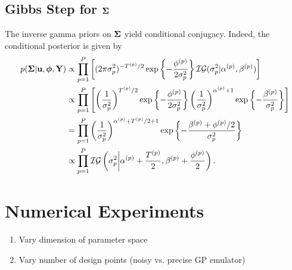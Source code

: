 \documentclass[12pt]{article}
\newcommand{\bphi}{\boldsymbol{\phi}}
\begin{document}
\subsection{Gibbs Step for $\boldsymbol{\Sigma}$}
The inverse gamma priors on $\boldsymbol{\Sigma}$ yield conditional conjugacy. Indeed, the conditional posterior is given by 
\begin{align*}
p(\CovObs | \bpar, \bphi, \stateMat) 
&\propto \prod_{\objIdx=1}^{\Nobj} \left[(2\pi\sdObs^2_{\objIdx})^{-\indexObj{\Ntime}/2} \exp\left\{-\frac{\indexObj{\phi} }{2\sdObs^2_{\objIdx}} \right\} 
\mathcal{IG}(\sdObs^2_{\objIdx}| \indexObj{\IGShape}, \indexObj{\IGScale}) \right] \\
&\propto \prod_{\objIdx=1}^{\Nobj} \left[\left(\frac{1}{\sdObs^2_{\objIdx}}\right)^{\indexObj{\Ntime}/2} \exp\left\{-\frac{\indexObj{\phi} }{2\sdObs^2_{\objIdx}} \right\} 
 \left(\frac{1}{\sdObs^2_{\objIdx}}\right)^{\indexObj{\IGShape}+1} \exp\left\{-\frac{\indexObj{\IGScale}}{\sdObs^2_{\objIdx}} \right\}\right] \\
 &= \prod_{\objIdx=1}^{\Nobj} \left(\frac{1}{\sdObs^2_{\objIdx}}\right)^{\indexObj{\IGShape}+\indexObj{\Ntime}/2+1} \exp\left\{-\frac{\indexObj{\IGScale} + \indexObj{\phi}/2}{\sdObs^2_{\objIdx}} \right\} \\
 &\propto \prod_{\objIdx=1}^{\Nobj} \mathcal{IG}\left(\sdObs^2_{\objIdx} \bigg| \indexObj{\IGShape} + \frac{\indexObj{\Ntime}}{2}, \indexObj{\IGScale} + \frac{\indexObj{\phi}}{2} \right).
\end{align*}



\section{Numerical Experiments}
\begin{enumerate}
\item Vary dimension of parameter space
\item Vary number of design points (noisy vs. precise GP emulator)
\end{enumerate}
\end{document}
